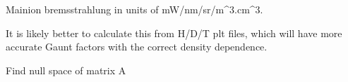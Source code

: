 \documentclass[letterpaper,10pt,english]{sphinxmanual}
\begin{document}

\begin{fulllineitems}
\label{\detokenize{aurora:aurora.atomic.main_ion_brems}}
Main\sphinxhyphen{}ion bremsstrahlung in units of  mW/nm/sr/m\textasciicircum{}3.cm\textasciicircum{}3.

It is likely better to calculate this from H/D/T plt files, which will have more accurate 
Gaunt factors with the correct density dependence.

\end{fulllineitems}


\begin{fulllineitems}
\label{\detokenize{aurora:aurora.atomic.null_space}}
Find null space of matrix A

\end{fulllineitems}

\end{document}
